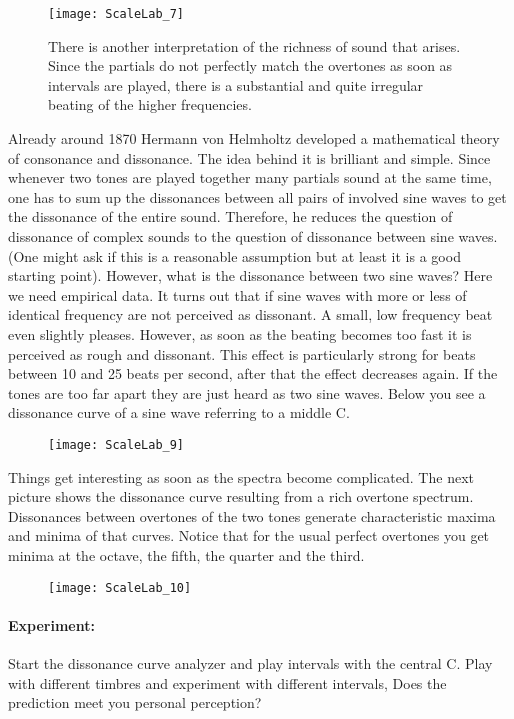 \begin{figure}[h]
\centering
\texttt{[image: ScaleLab\_7]}
\caption*{There is another interpretation of the richness of sound that arises. Since the partials do not perfectly match the overtones as soon as intervals are played, there is a substantial and quite irregular beating of the higher frequencies.}
\end{figure}

Already around 1870 Hermann von Helmholtz developed a mathematical theory of consonance and dissonance. The idea behind it is brilliant and simple. Since whenever two tones are played together many partials sound at the same time, one has to sum up the dissonances between all pairs of involved sine waves to get the dissonance of the entire sound. Therefore, he reduces the question of dissonance of complex sounds to the question of dissonance between sine waves. (One might ask if this is a reasonable assumption but at least it is a good starting point). However, what is the dissonance between two sine waves? Here we need empirical data. It turns out that if sine waves with more or less of identical frequency are not perceived as dissonant. A small, low frequency beat even slightly pleases. However, as soon as the beating becomes too fast it is perceived as rough and dissonant. This effect is particularly strong for beats between 10 and 25 beats per second, after that the effect decreases again. If the tones are too far apart they are just heard as two sine waves. Below you see a dissonance curve of a sine wave referring to a middle C.

\begin{figure}[h]
\centering
\texttt{[image: ScaleLab\_9]}
\end{figure}

Things get interesting as soon as the spectra become complicated. The next picture shows the dissonance curve resulting from a rich overtone spectrum. Dissonances between overtones of the two tones generate characteristic maxima and minima of that curves. Notice that for the usual perfect overtones you get minima at the octave, the fifth, the quarter and the third. 

\begin{figure}[h]
\centering
\texttt{[image: ScaleLab\_10]}
\end{figure}

\paragraph{Experiment:}
Start the dissonance curve analyzer and play intervals with the central C. Play with different timbres and experiment with different intervals, Does the prediction meet you personal perception?


